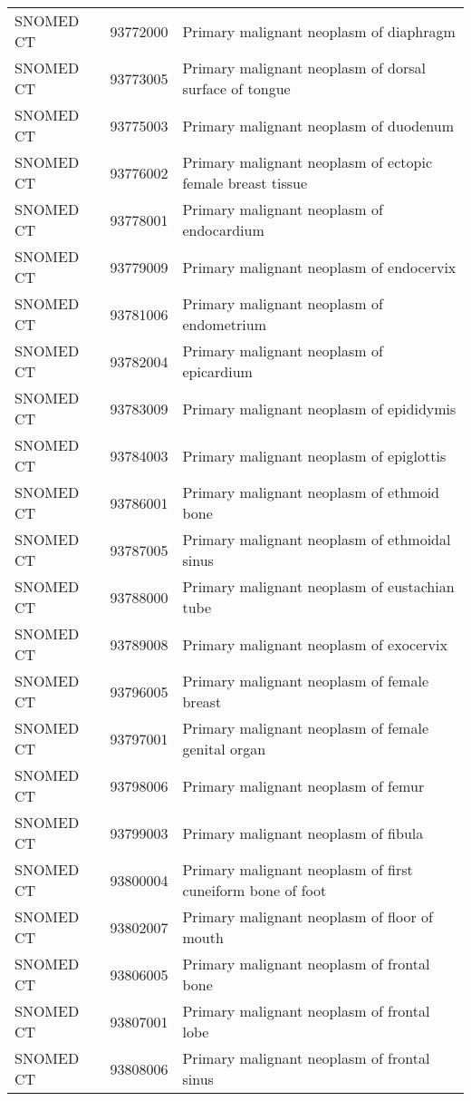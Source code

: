 \begin{longtable}{p{}p{}p{}}
  SNOMED CT & 93772000 & Primary malignant neoplasm of diaphragm \\ 
  SNOMED CT & 93773005 & Primary malignant neoplasm of dorsal surface of tongue \\ 
  SNOMED CT & 93775003 & Primary malignant neoplasm of duodenum \\ 
  SNOMED CT & 93776002 & Primary malignant neoplasm of ectopic female breast tissue \\ 
  SNOMED CT & 93778001 & Primary malignant neoplasm of endocardium \\ 
  SNOMED CT & 93779009 & Primary malignant neoplasm of endocervix \\ 
  SNOMED CT & 93781006 & Primary malignant neoplasm of endometrium \\ 
  SNOMED CT & 93782004 & Primary malignant neoplasm of epicardium \\ 
  SNOMED CT & 93783009 & Primary malignant neoplasm of epididymis \\ 
  SNOMED CT & 93784003 & Primary malignant neoplasm of epiglottis \\ 
  SNOMED CT & 93786001 & Primary malignant neoplasm of ethmoid bone \\ 
  SNOMED CT & 93787005 & Primary malignant neoplasm of ethmoidal sinus \\ 
  SNOMED CT & 93788000 & Primary malignant neoplasm of eustachian tube \\ 
  SNOMED CT & 93789008 & Primary malignant neoplasm of exocervix \\ 
  SNOMED CT & 93796005 & Primary malignant neoplasm of female breast \\ 
  SNOMED CT & 93797001 & Primary malignant neoplasm of female genital organ \\ 
  SNOMED CT & 93798006 & Primary malignant neoplasm of femur \\ 
  SNOMED CT & 93799003 & Primary malignant neoplasm of fibula \\ 
  SNOMED CT & 93800004 & Primary malignant neoplasm of first cuneiform bone of foot \\ 
  SNOMED CT & 93802007 & Primary malignant neoplasm of floor of mouth \\ 
  SNOMED CT & 93806005 & Primary malignant neoplasm of frontal bone \\ 
  SNOMED CT & 93807001 & Primary malignant neoplasm of frontal lobe \\ 
  SNOMED CT & 93808006 & Primary malignant neoplasm of frontal sinus \\ 

\end{longtable}
